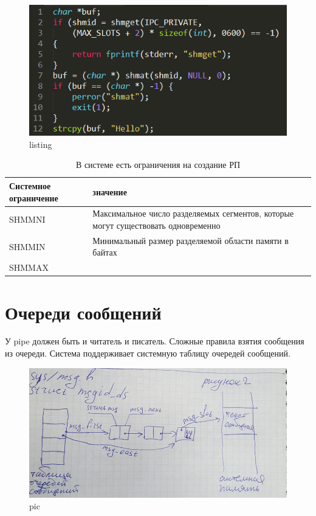 \begin{figure}[H]
    \centering
    \includegraphics[width=\textwidth]{listing/3.png}
    \caption{listing}
\end{figure}

\begin{table}[H]
\caption{В системе есть ограничения на создание РП}
\begin{tabular}{|l|p{11cm}|}
\hline
Системное ограничение & значение \\
\hline
SHMMNI & Максимальное число разделяемых сегментов, которые могут существовать одновременно \\
\hline
SHMMIN & Минимальный размер разделяемой области памяти в байтах\\
\hline
SHMMAX & \\
\hline
\end{tabular}
\end{table}

\section{Очереди сообщений}

У pipe должен быть и читатель и писатель. Сложные правила взятия сообщения из очереди. Система поддерживает системную таблицу очередей сообщений. 

\begin{figure}[H]
    \centering
    \includegraphics[width=\textwidth]{pic/2.png}
    \caption{pic}
\end{figure}

